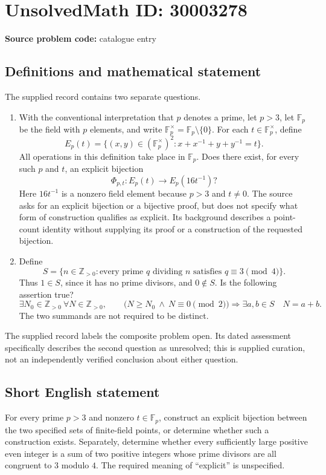\documentclass[11pt]{article}
\newcommand{\Z}{\mathbb{Z}}
\newcommand{\F}{\mathbb{F}}
\begin{document}
\section*{UnsolvedMath ID: 30003278}
\textbf{Source problem code:} catalogue entry
\subsection{Definitions and mathematical statement}
The supplied record contains two separate questions.

\begin{enumerate}
\item With the conventional interpretation that \(p\) denotes a prime, let \(p>3\), let \(\F_p\) be the field with \(p\) elements, and write \(\F_p^\times=\F_p\setminus\{0\}\). For each \(t\in\F_p^\times\), define
\[
E_p(t)=\bigl\{(x,y)\in(\F_p^\times)^2:x+x^{-1}+y+y^{-1}=t\bigr\}.
\]
All operations in this definition take place in \(\F_p\). Does there exist, for every such \(p\) and \(t\), an explicit bijection
\[
\Phi_{p,t}:E_p(t)\longrightarrow E_p(16t^{-1})?
\]
Here \(16t^{-1}\) is a nonzero field element because \(p>3\) and \(t\ne0\). The source asks for an explicit bijection or a bijective proof, but does not specify what form of construction qualifies as explicit. Its background describes a point-count identity without supplying its proof or a construction of the requested bijection.

\item Define
\[
S=\bigl\{n\in\Z_{>0}:\text{every prime }q\text{ dividing }n\text{ satisfies }q\equiv3\pmod4\bigr\}.
\]
Thus \(1\in S\), since it has no prime divisors, and \(0\notin S\). Is the following assertion true?
\[
\exists N_0\in\Z_{>0}\ \forall N\in\Z_{>0},\qquad
\bigl(N\ge N_0\ \land\ N\equiv0\pmod2\bigr)
\Longrightarrow
\exists a,b\in S\quad N=a+b.
\]
The two summands are not required to be distinct.
\end{enumerate}

The supplied record labels the composite problem open. Its dated assessment specifically describes the second question as unresolved; this is supplied curation, not an independently verified conclusion about either question.
\subsection{Short English statement}
For every prime \(p>3\) and nonzero \(t\in\F_p\), construct an explicit bijection between the two specified sets of finite-field points, or determine whether such a construction exists. Separately, determine whether every sufficiently large positive even integer is a sum of two positive integers whose prime divisors are all congruent to \(3\) modulo \(4\). The required meaning of ``explicit'' is unspecified.
\end{document}
